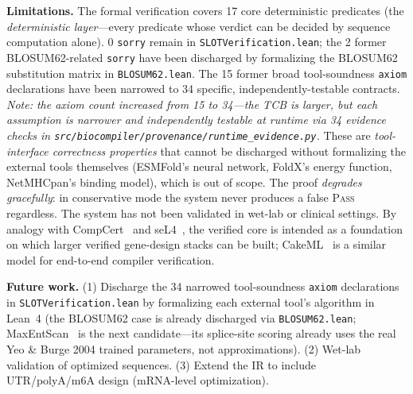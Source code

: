 \documentclass[11pt,a4paper]{article}
\theoremstyle{definition}
\newcommand{\PASS}{\textsc{Pass}}
\begin{document}
\textbf{Limitations.} The formal verification covers 17 core deterministic predicates (the \emph{deterministic layer}---every predicate whose verdict can be decided by sequence computation alone). 0 \texttt{sorry} remain in \texttt{SLOTVerification.lean}; the 2 former BLOSUM62-related \texttt{sorry} have been discharged by formalizing the BLOSUM62 substitution matrix in \texttt{BLOSUM62.lean}. The 15 former broad tool-soundness \texttt{axiom} declarations have been narrowed to 34 specific, independently-testable contracts. \emph{Note: the axiom count increased from 15 to 34---the TCB is larger, but each assumption is narrower and independently testable at runtime via 34 evidence checks in \texttt{src/biocompiler/provenance/runtime\_evidence.py}.} These are \emph{tool-interface correctness properties} that cannot be discharged without formalizing the external tools themselves (ESMFold's neural network, FoldX's energy function, NetMHCpan's binding model), which is out of scope. The proof \emph{degrades gracefully}: in conservative mode the system never produces a false \PASS{} regardless. The system has not been validated in wet-lab or clinical settings. By analogy with CompCert~\cite{leroy2009compcert} and seL4~\cite{klein2014sel4}, the verified core is intended as a foundation on which larger verified gene-design stacks can be built; CakeML~\cite{kumar2014cakeml} is a similar model for end-to-end compiler verification.

\textbf{Future work.} (1) Discharge the 34 narrowed tool-soundness \texttt{axiom} declarations in \texttt{SLOTVerification.lean} by formalizing each external tool's algorithm in Lean~4 (the BLOSUM62 case is already discharged via \texttt{BLOSUM62.lean}; MaxEntScan~\cite{yeo2004maxentscan} is the next candidate---its splice-site scoring already uses the real Yeo \& Burge 2004 trained parameters, not approximations). (2) Wet-lab validation of optimized sequences. (3) Extend the IR to include UTR/polyA/m6A design (mRNA-level optimization).

\clearpage


\end{document}

